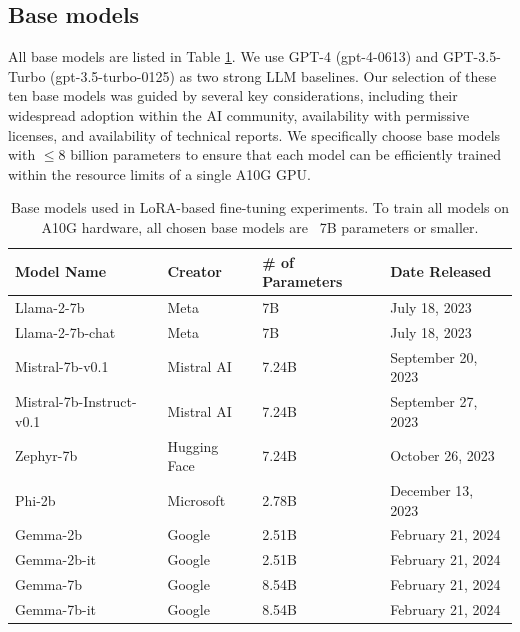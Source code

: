 \subsection{Base models}

All base models are listed in Table \ref{table:basemodels}. We use GPT-4 (gpt-4-0613) and GPT-3.5-Turbo (gpt-3.5-turbo-0125) as two strong LLM baselines. Our selection of these ten base models was guided by several key considerations, including their widespread adoption within the AI community, availability with permissive licenses, and availability of technical reports. We specifically choose base models with $\leq 8$ billion parameters to ensure that each model can be efficiently trained within the resource limits of a single A10G GPU. 

\begin{table}[ht]
\centering  
\footnotesize %
\begin{tabular}{llll}
\textbf{Model Name}      & \textbf{Creator} & \textbf{\# of Parameters} & \textbf{Date Released} \\
\midrule
Llama-2-7b               & Meta             & 7B                        & July 18, 2023          \\
Llama-2-7b-chat          & Meta             & 7B                        & July 18, 2023          \\
Mistral-7b-v0.1          & Mistral AI       & 7.24B                     & September 20, 2023     \\
Mistral-7b-Instruct-v0.1 & Mistral AI       & 7.24B                     & September 27, 2023     \\
Zephyr-7b                & Hugging Face     & 7.24B                     & October 26, 2023       \\
Phi-2b                   & Microsoft        & 2.78B                     & December 13, 2023      \\
Gemma-2b                 & Google           & 2.51B                     & February 21, 2024      \\
Gemma-2b-it              & Google           & 2.51B                     & February 21, 2024      \\
Gemma-7b                 & Google           & 8.54B                     & February 21, 2024      \\
Gemma-7b-it              & Google           & 8.54B                     & February 21, 2024     
\end{tabular}

\caption{Base models used in LoRA-based fine-tuning experiments. To train all models on A10G hardware, all chosen base models are ~7B parameters or smaller.}
\label{table:basemodels}
\end{table}

